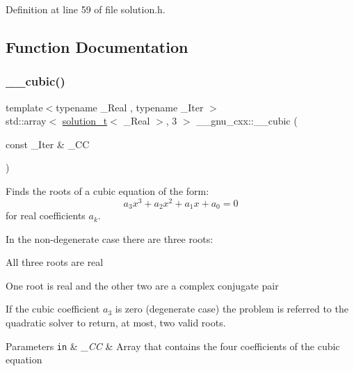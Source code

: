 Definition at line 59 of file solution.\+h.



\subsection{Function Documentation}
\mbox{\label{namespace____gnu__cxx_a422f638b186be2071012321de5f9bb48}} 
\subsubsection{\texorpdfstring{\+\_\+\+\_\+cubic()}{\_\_cubic()}\hspace{0.1cm}{\footnotesize\ttfamily [1/2]}}
{\footnotesize\ttfamily template$<$typename \+\_\+\+Real , typename \+\_\+\+Iter $>$ \\
std\+::array$<$ \hyperlink{namespace____gnu__cxx_ae20ea642de50eb361074c62676b0159c}{solution\+\_\+t}$<$ \+\_\+\+Real $>$, 3 $>$ \+\_\+\+\_\+gnu\+\_\+cxx\+::\+\_\+\+\_\+cubic (\begin{DoxyParamCaption}\item[{const \+\_\+\+Iter \&}]{\+\_\+\+CC }\end{DoxyParamCaption})}



Finds the roots of a cubic equation of the form\+: \[ a_3 x^3 + a_2 x^2 + a_1 x + a_0 = 0 \] for real coefficients $ a_k $. 

In the non-\/degenerate case there are three roots\+:
\begin{DoxyItemize}
\item All three roots are real
\item One root is real and the other two are a complex conjugate pair
\end{DoxyItemize}

If the cubic coefficient $ a_3 $ is zero (degenerate case) the problem is referred to the quadratic solver to return, at most, two valid roots.


\begin{DoxyParams}[1]{Parameters}
\mbox{\tt in}  & {\em \+\_\+\+CC} & Array that contains the four coefficients of the cubic equation \\
\hline
\end{DoxyParams}


